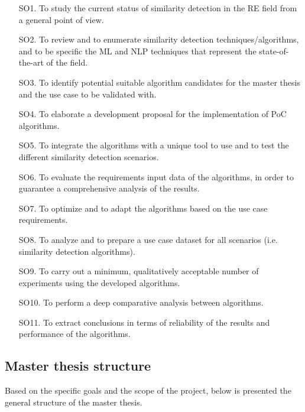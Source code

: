 \documentclass[11pt]{article}
\begin{document}
\begin{enumerate}
\item[SO1.] To study the current status of similarity detection in the RE field from a general point of view.
\item[SO2.] To review and to enumerate similarity detection techniques/algorithms, and to be specific the ML and NLP techniques that represent the state-of-the-art of the field.
\item[SO3.] To identify potential suitable algorithm candidates for the master thesis and the use case to be validated with.
\item[SO4.] To elaborate a development proposal for the implementation of PoC algorithms.
\item[SO5.] To integrate the algorithms with a unique tool to use and to test the different similarity detection scenarios.
\item[SO6.] To evaluate the requirements input data of the algorithms, in order to guarantee a comprehensive analysis of the results.
\item[SO7.] To optimize and to adapt the algorithms based on the use case requirements.
\item[SO8.] To analyze and to prepare a use case dataset for all scenarios (i.e. similarity detection algorithms).
\item[SO9.] To carry out a minimum, qualitatively acceptable number of experiments using the developed algorithms.
\item[SO10.] To perform a deep comparative analysis between algorithms.
\item[SO11.] To extract conclusions in terms of reliability of the results and performance of the algorithms.
\end{enumerate}

\subsection{Master thesis structure}

Based on the specific goals and the scope of the project, below is presented the general structure of the master thesis.
\end{document}

